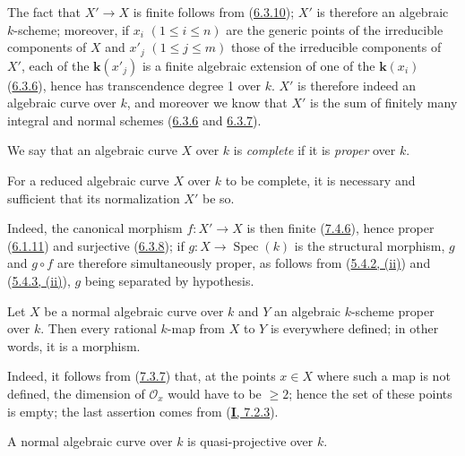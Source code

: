 The fact that $X'\to X$ is finite follows from
(\hyperref[II.6.3.10]{6.3.10}); $X'$ is therefore an algebraic $k$-scheme;
moreover, if $x_i$ $(1\leq i\leq n)$ are the generic points of the irreducible
components of $X$ and $x'_j$ $(1\leq j\leq m)$ those of the irreducible
components of $X'$, each of the $\boldsymbol{k}(x'_j)$ is a finite algebraic extension of
one of the $\boldsymbol{k}(x_i)$ (\hyperref[II.6.3.6]{6.3.6}), hence has transcendence
degree 1 over $k$. $X'$ is therefore indeed an algebraic curve over $k$, and
moreover we know that $X'$ is the sum of finitely many integral and normal
schemes (\hyperref[II.6.3.6]{6.3.6} and
\hyperref[II.6.3.7]{6.3.7}).

\begin{env}[7.4.7]
\label{II.7.4.7}
We say that an algebraic curve $X$ over $k$ is \emph{complete} if it is
\emph{proper} over $k$.
\end{env}

\begin{corollary}[7.4.8]
\label{II.7.4.8}
For a reduced algebraic curve $X$ over $k$ to be complete, it is necessary and
sufficient that its normalization $X'$ be so.
\end{corollary}

Indeed, the canonical morphism $f:X'\to X$ is then finite
(\hyperref[II.7.4.6]{7.4.6}), hence proper
(\hyperref[II.6.1.11]{6.1.11}) and surjective
(\hyperref[II.6.3.8]{6.3.8}); if $g:X\to\operatorname{Spec}(k)$ is the
structural morphism, $g$ and $g\circ f$ are therefore simultaneously proper,
as follows from (\hyperref[II.5.4.2]{5.4.2, (ii)}) and
(\hyperref[II.5.4.3]{5.4.3, (ii)}), $g$ being separated by hypothesis.

\begin{proposition}[7.4.9]
\label{II.7.4.9}
Let $X$ be a \textup{normal} algebraic curve over $k$ and $Y$ an algebraic $k$-scheme
\textup{proper} over $k$. Then every rational $k$-map from $X$ to $Y$ is
everywhere defined; in other words, it is a morphism.
\end{proposition}

Indeed, it follows from (\hyperref[II.7.3.7]{7.3.7}) that, at the points
$x\in X$ where such a map is not defined, the dimension of $\mathcal{O}_x$
would have to be $\geq2$; hence the set of these points is empty; the last
assertion comes from (\hyperref[I.7.2.3]{\textbf{I}, 7.2.3}).

\begin{corollary}[7.4.10]
\label{II.7.4.10}
A normal algebraic curve over $k$ is quasi-projective over $k$.
\end{corollary}

